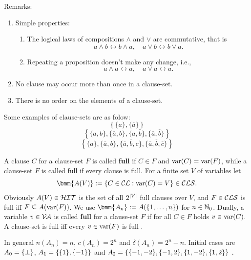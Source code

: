 \documentclass[12pt]{book}
\begin{document}
Remarks:
\begin{enumerate}
      \item Simple properties:
      \begin{enumerate}
            \item The logical laws of compositions $\wedge$ and $\vee$ are commutative, that is
            $$a\wedge b \leftrightarrow b\wedge a, \quad  a\vee b \leftrightarrow b\vee a.$$
            \item Repeating a proposition doesn't make any change, i.e.,
            $$a\wedge a \leftrightarrow a, \quad  a\vee a \leftrightarrow a.$$
      \end{enumerate}
      \item No clause may occur more than once in a clause-set.
      \item There is no order on the elements of a clause-set.
\end{enumerate}
\begin{examp}\label{exp:cls}
      Some examples of clause-sets are as folow:
      $$\left\{\{a\}, \{\overline{a}\}\right\}$$
      $$\left\{\{a,b\}, \{\overline{a},b\}, \{a, \overline{b}\}, \{\overline{a},\overline{b}\}\right\}$$
      $$\left\{\{a\}, \{\overline{a},b\}, \{\overline{a}, \overline{b}, c\}, \{\overline{a}, \overline{b}, \overline{c}\}\right\}$$
\end{examp}
\begin{defi}\label{def:fullcls}
      A clause $C$  for a clause-set $F$ is called \textbf{full} if $C \in F$ and $\operatorname{var}(C) = \operatorname{var}(F)$, while a clause-set 
	  $F$ is called full if every clause is full. For a finite set $V$ of variables let
      \begin{displaymath}
      \bmm{A(V)} := \set{C \in \Cl : \var(C) = V} \in \Cls.
      \end{displaymath}
      Obviously $A(V) \in \mathcal{HIT}$ is the set of all $2^{\lvert V \rvert}$ full clauses over $V$, and $F \in \mathcal{CLS}$ is full iff 
	  $F \subseteq A(\operatorname{var}(F))$. We use $\bmm{A_n} := A(\tb 1n)$ for $n \in \mathbb{N}_0$. Dually, a variable $v \in \mathcal{V\hspace{-0.1em}A}$ is called 
	  \textbf{full} for a clause-set $F$ if for all $C \in F$ holds $v \in \operatorname{var}(C)$. A clause-set is full iff every 
	  $v \in \operatorname{var}(F)$ is full \cite{h9}.
\end{defi}

\begin{examp}\label{exp:An}
  In general $n(A_n) = n$, $c(A_n) = 2^n$ and $\delta(A_n) = 2^n-n$. Initial cases are $A_0 = \{ \bot \}$, $A_1 = \{ \{ 1 \},\{ -1 \} \}$ 
  and $A_2 = \{ \{ -1,-2 \},\{ -1,2 \},\{ 1,-2 \},\{ 1,2 \} \}$ \cite{h12}.
\end{examp}
\end{document}
